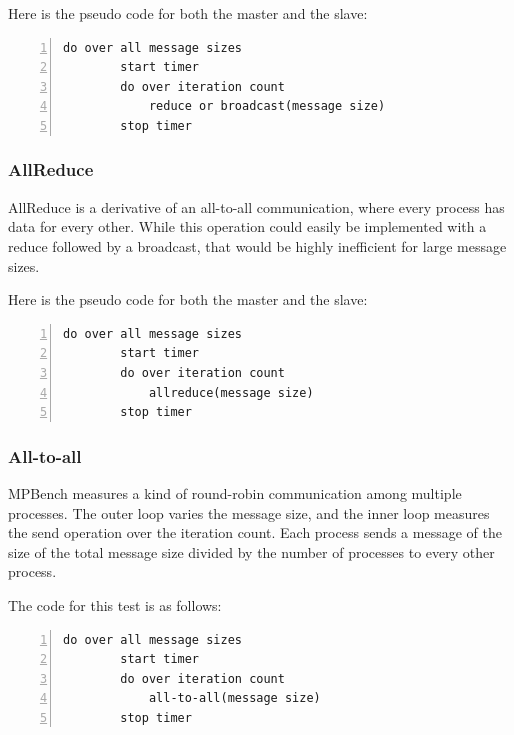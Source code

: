 Here is the pseudo code for both the master and the slave:


\begin{lstlisting}[frame=single,numbers=left]
   do over all message sizes 
        start timer
        do over iteration count
            reduce or broadcast(message size)
        stop timer
\end{lstlisting}

\subsubsection{AllReduce}

AllReduce is a derivative of an all-to-all communication, where every
process has data for every other. While this operation could easily be
implemented with a reduce followed by a broadcast, that would be highly
inefficient for large message sizes. 

Here is the pseudo code for both the master and the slave:

\begin{lstlisting}[frame=single,numbers=left]
    do over all message sizes 
        start timer
        do over iteration count 
            allreduce(message size) 
        stop timer
\end{lstlisting}


\subsubsection{All-to-all}

MPBench measures a kind of round-robin communication among multiple
processes. The outer loop varies the message size, and the inner loop
measures the send operation over the iteration count. Each process sends a
message of the size of the total message size divided by the number of
processes to every other process.

The code for this test is as follows:

\begin{lstlisting}[frame=single,numbers=left]
    do over all message sizes 
        start timer
        do over iteration count 
            all-to-all(message size)
        stop timer
\end{lstlisting}

\clearpage
